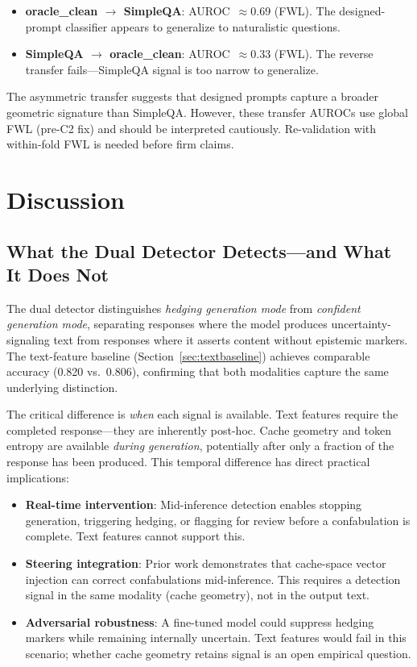 \documentclass[11pt,a4paper]{article}
\begin{document}
\begin{itemize}[nosep]
    \item \textbf{oracle\_clean $\to$ SimpleQA}: AUROC~$\approx$0.69 (FWL). The designed-prompt classifier appears to generalize to naturalistic questions.
    \item \textbf{SimpleQA $\to$ oracle\_clean}: AUROC~$\approx$0.33 (FWL). The reverse transfer fails---SimpleQA signal is too narrow to generalize.
\end{itemize}

The asymmetric transfer suggests that designed prompts capture a broader geometric signature than SimpleQA. However, these transfer AUROCs use global FWL (pre-C2 fix) and should be interpreted cautiously. Re-validation with within-fold FWL is needed before firm claims.

\section{Discussion}
\label{sec:discussion}

\subsection{What the Dual Detector Detects---and What It Does Not}

The dual detector distinguishes \emph{hedging generation mode} from \emph{confident generation mode}, separating responses where the model produces uncertainty-signaling text from responses where it asserts content without epistemic markers. The text-feature baseline (Section~\ref{sec:textbaseline}) achieves comparable accuracy (0.820 vs.\ 0.806), confirming that both modalities capture the same underlying distinction.

The critical difference is \emph{when} each signal is available. Text features require the completed response---they are inherently post-hoc. Cache geometry and token entropy are available \emph{during generation}, potentially after only a fraction of the response has been produced. This temporal difference has direct practical implications:

\begin{itemize}[nosep]
    \item \textbf{Real-time intervention}: Mid-inference detection enables stopping generation, triggering hedging, or flagging for review before a confabulation is complete. Text features cannot support this.
    \item \textbf{Steering integration}: Prior work \citep{edrington2026detecting} demonstrates that cache-space vector injection can correct confabulations mid-inference. This requires a detection signal in the same modality (cache geometry), not in the output text.
    \item \textbf{Adversarial robustness}: A fine-tuned model could suppress hedging markers while remaining internally uncertain. Text features would fail in this scenario; whether cache geometry retains signal is an open empirical question.
\end{itemize}
\end{document}
